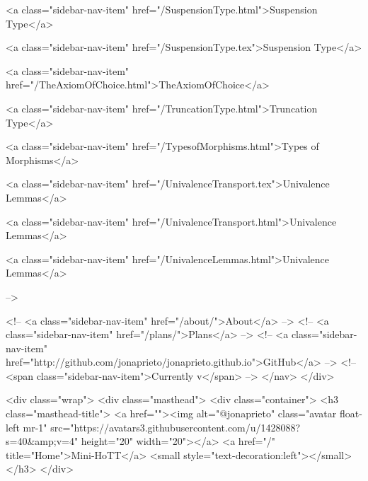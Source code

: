       
    
      
        
          <a class="sidebar-nav-item" href="/SuspensionType.html">Suspension Type</a>
        
      
    
      
        
          <a class="sidebar-nav-item" href="/SuspensionType.tex">Suspension Type</a>
        
      
    
      
        
          <a class="sidebar-nav-item" href="/TheAxiomOfChoice.html">TheAxiomOfChoice</a>
        
      
    
      
        
          <a class="sidebar-nav-item" href="/TruncationType.html">Truncation Type</a>
        
      
    
      
        
          <a class="sidebar-nav-item" href="/TypesofMorphisms.html">Types of Morphisms</a>
        
      
    
      
        
          <a class="sidebar-nav-item" href="/UnivalenceTransport.tex">Univalence Lemmas</a>
        
      
    
      
        
          <a class="sidebar-nav-item" href="/UnivalenceTransport.html">Univalence Lemmas</a>
        
      
    
      
        
          <a class="sidebar-nav-item" href="/UnivalenceLemmas.html">Univalence Lemmas</a>
        
      
     -->

    <!-- <a class="sidebar-nav-item" href="/about/">About</a> -->
    <!-- <a class="sidebar-nav-item" href="/plans/">Plans</a> -->
    <!-- <a class="sidebar-nav-item" href="http://github.com/jonaprieto/jonaprieto.github.io">GitHub</a> -->
    <!-- <span class="sidebar-nav-item">Currently v</span> -->
  </nav>
</div>

    <div class="wrap">
      <div class="masthead">
        <div class="container">
          <h3 class="masthead-title">
            <a href=""><img alt="@jonaprieto" class="avatar float-left mr-1" src="https://avatars3.githubusercontent.com/u/1428088?s=40&amp;v=4" height="20" width="20"></a>
            <a href="/" title="Home">Mini-HoTT</a>
            <small style="text-decoration:left"></small>
          </h3>
        </div>
      
